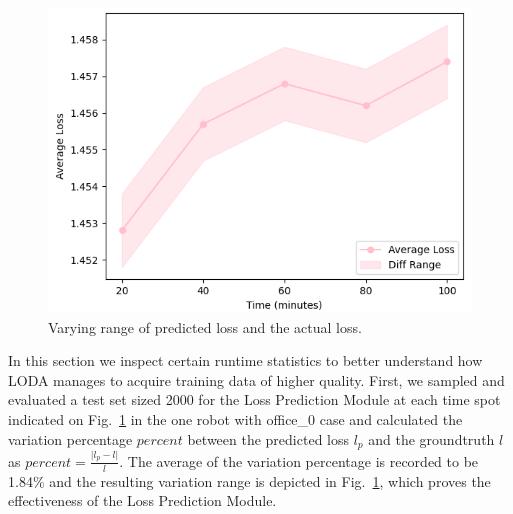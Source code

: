 \begin{figure}[h!]
    \centering
    \vspace{-0.3cm}
    \includegraphics[width=0.7\linewidth]{fig/breakdown_prediction.png}
    \vspace{-0.3cm}
    \caption{Varying range of predicted loss and the actual loss.}
    \label{prediction}
\end{figure}


In this section we inspect certain runtime statistics to better understand how LODA manages to acquire training data of higher quality.
First, we sampled and evaluated a test set sized 2000 for the Loss Prediction Module at each time spot indicated on Fig.~\ref*{prediction} in the one robot with office\_0 case and calculated the variation percentage $percent$ between the predicted loss $l_p$ and the groundtruth $l$ as $percent = \frac{\vert l_{p }- l \vert}{l}$.
The average of the variation percentage is recorded to be 1.84\% and the resulting variation range is depicted in Fig.~\ref{prediction}, which proves the effectiveness of the Loss Prediction Module.


